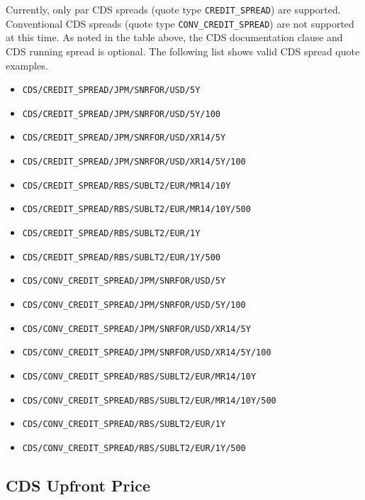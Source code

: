 Currently, only par CDS spreads (quote type \lstinline!CREDIT_SPREAD!) are supported. Conventional CDS spreads (quote type \lstinline!CONV_CREDIT_SPREAD!) are not supported at this time.
As noted in the table above, the CDS documentation clause and CDS running spread is optional. The following list shows valid CDS spread quote examples.
\begin{itemize}
\item \lstinline!CDS/CREDIT_SPREAD/JPM/SNRFOR/USD/5Y!
\item \lstinline!CDS/CREDIT_SPREAD/JPM/SNRFOR/USD/5Y/100!
\item \lstinline!CDS/CREDIT_SPREAD/JPM/SNRFOR/USD/XR14/5Y!
\item \lstinline!CDS/CREDIT_SPREAD/JPM/SNRFOR/USD/XR14/5Y/100!
\item \lstinline!CDS/CREDIT_SPREAD/RBS/SUBLT2/EUR/MR14/10Y!
\item \lstinline!CDS/CREDIT_SPREAD/RBS/SUBLT2/EUR/MR14/10Y/500!
\item \lstinline!CDS/CREDIT_SPREAD/RBS/SUBLT2/EUR/1Y!
\item \lstinline!CDS/CREDIT_SPREAD/RBS/SUBLT2/EUR/1Y/500!
\item \lstinline!CDS/CONV_CREDIT_SPREAD/JPM/SNRFOR/USD/5Y!
\item \lstinline!CDS/CONV_CREDIT_SPREAD/JPM/SNRFOR/USD/5Y/100!
\item \lstinline!CDS/CONV_CREDIT_SPREAD/JPM/SNRFOR/USD/XR14/5Y!
\item \lstinline!CDS/CONV_CREDIT_SPREAD/JPM/SNRFOR/USD/XR14/5Y/100!
\item \lstinline!CDS/CONV_CREDIT_SPREAD/RBS/SUBLT2/EUR/MR14/10Y!
\item \lstinline!CDS/CONV_CREDIT_SPREAD/RBS/SUBLT2/EUR/MR14/10Y/500!
\item \lstinline!CDS/CONV_CREDIT_SPREAD/RBS/SUBLT2/EUR/1Y!
\item \lstinline!CDS/CONV_CREDIT_SPREAD/RBS/SUBLT2/EUR/1Y/500!
\end{itemize}

\subsection{CDS Upfront Price}
\label{md:cds_price_quote}


